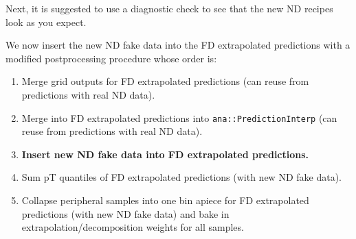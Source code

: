 \documentclass{article}
\begin{document}
Next, it is suggested to use a diagnostic check to see that the new ND recipes look as you expect.

We now insert the new ND fake data into the FD extrapolated predictions with a modified postprocessing procedure whose order is:
\begin{enumerate}
  \item Merge grid outputs for FD extrapolated predictions (can reuse from predictions with real ND data).
  \item Merge into FD extrapolated predictions into \texttt{ana::Prediction\-Interp} (can reuse from predictions with real ND data).
  \item \textbf{Insert new ND fake data into FD extrapolated predictions.}
  \item Sum pT quantiles of FD extrapolated predictions (with new ND fake data).
  \item Collapse peripheral samples into one bin apiece for FD extrapolated predictions (with new ND fake data) and bake in extrapolation/decomposition weights for all samples.
\end{enumerate}
\end{document}
